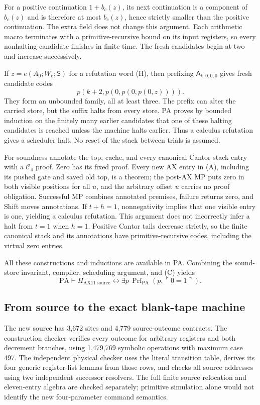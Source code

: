 For a positive continuation $1+b_c(z)$, its next continuation is a
component of $b_c(z)$ and is therefore at most $b_c(z)$, hence strictly
smaller than the positive continuation. The extra field does not change
this argument. Each arithmetic macro terminates with a primitive-recursive
bound on its input registers, so every nonhalting candidate finishes in
finite time. The fresh candidates begin at two and increase successively.

If $z=e(A_0;W_e;\mathsf S)$ for a refutation word (H), then prefixing
$\mathsf A_{k,0,0,0}$ gives fresh candidate codes
\[
                 p(k+2,p(0,p(0,p(0,z)))) .                  \tag{Cof}
\]
They form an unbounded family, all at least three. The prefix can alter
the carried store, but the suffix halts from every store. PA proves by
bounded induction on the finitely many earlier candidates that one of
these halting candidates is reached unless the machine halts earlier.
Thus a calculus refutation gives a scheduler halt. No reset of the stack
between trials is assumed.

For soundness annotate the top, cache, and every canonical Cantor-stack
entry with a $\mathcal C_4$ proof. Zero has its fixed proof. Every new AX
entry in (A), including its pushed gate and saved old top, is a theorem;
the post-AX MP puts zero in both visible positions for all $u$, and the
arbitrary offset $u$ carries no proof obligation. Successful MP combines
annotated premises, failure returns zero, and Shift moves annotations.
If $t+h=1$, nonnegativity implies that one visible entry is one, yielding
a calculus refutation. This argument does not incorrectly infer a halt
from $t=1$ when $h=1$. Positive Cantor tails decrease strictly, so the
finite canonical stack and its annotations have primitive-recursive
codes, including the virtual zero entries.

All these constructions and inductions are available in PA. Combining
the sound-store invariant, compiler, scheduling argument, and (C) yields
\[
 \mathrm{PA}\vdash
  H_{\mathrm{AX11\ source}}
   \leftrightarrow
    \exists p\,\operatorname{Prf}_{\mathrm{PA}}(p,\ulcorner0=1\urcorner).
\]

\subsection{From source to the exact blank-tape machine}

The new source has 3,672 sites and 4,779 source-outcome contracts. The
construction checker verifies every outcome for arbitrary registers and
both decrement branches, using 1,479,769 symbolic operations with maximum
case 497. The independent physical checker uses the literal transition
table, derives its four generic register-list lemmas from those rows, and
checks all source addresses using two independent successor resolvers.
The full finite source relocation and eleven-entry algebra are checked
separately; primitive simulation alone would not identify the new
four-parameter command semantics.

